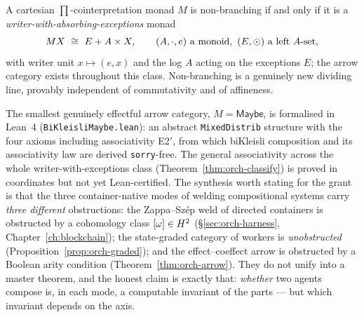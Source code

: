 \begin{theorem}\label{thm:orch-classify}
A cartesian $\prod$-cointerpretation monad $M$ is non-branching if and only if it is a
\emph{writer-with-absorbing-exceptions} monad
\[
  MX\ \cong\ E+A\times X,\qquad (A,\cdot,e)\ \text{a monoid},\ (E,\odot)\ \text{a left $A$-set},
\]
with writer unit $x\mapsto(e,x)$ and the log $A$ acting on the exceptions $E$; the arrow category
exists throughout this class. Non-branching is a genuinely new dividing line, provably independent of
commutativity and of affineness.
\end{theorem}

\begin{remark}\label{rem:orch-arrow-lean}
The smallest genuinely effectful arrow category, $M=\mathsf{Maybe}$, is formalised in Lean~4
(\texttt{BiKleisliMaybe.lean}): an abstract \texttt{MixedDistrib} structure with the four axioms
including associativity E2$'$, from which biKleisli composition and its associativity law are derived
\texttt{sorry}-free. The general associativity across the whole writer-with-exceptions class
(Theorem~\ref{thm:orch-classify}) is proved in coordinates but not yet Lean-certified.
The synthesis worth stating for the grant is that the three container-native modes of welding
compositional systems carry \emph{three different} obstructions: the Zappa--Sz\'ep weld of directed
containers is obstructed by a cohomology class $[\omega]\in H^2$ (\S\ref{sec:orch-harness},
Chapter~\ref{ch:blockchain}); the state-graded category of workers is \emph{unobstructed}
(Proposition~\ref{prop:orch-graded}); and the effect--coeffect arrow is obstructed by a Boolean arity
condition (Theorem~\ref{thm:orch-arrow}). They do not unify into a master theorem, and the honest
claim is exactly that: \emph{whether} two agents compose is, in each mode, a computable invariant of
the parts --- but which invariant depends on the axis.
\end{remark}
